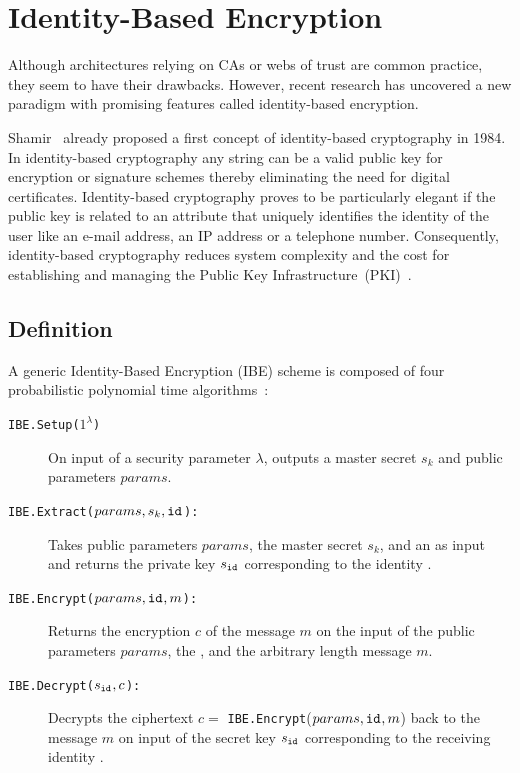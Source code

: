 \section{Identity-Based Encryption}
Although architectures relying on CAs or webs of trust are common practice, they seem to have their drawbacks. However, recent research has uncovered a new paradigm with promising features called identity-based encryption.

Shamir~\cite{art:Shamir84} already proposed a first concept of identity-based cryptography in 1984. In identity-based cryptography any string can be a valid public key for encryption or signature schemes thereby eliminating the need for digital certificates. Identity-based cryptography proves to be particularly elegant if the public key is related to an attribute that uniquely identifies the identity of the user like an e-mail address, an IP address or a telephone number. Consequently, identity-based cryptography reduces system complexity and the cost for establishing and managing the Public Key Infrastructure~(PKI)~\cite{art:BaekNSS04}. 


\subsection{Definition}
A generic Identity-Based Encryption (IBE) scheme is composed of four probabilistic polynomial time algorithms~\cite{art:BonehF01}:
\begin{description}
    \item[\texttt{IBE.Setup($1^{\lambda}$)}] On input of a security parameter $\lambda$, outputs a master secret $s_k$ and public parameters $params$.
    \item[\texttt{IBE.Extract($params, s_k, \mathtt{id}_{}$):}] Takes public parameters $params$, the master secret $s_k$, and an \id{} as input and returns the private key $s_{\mathtt{id}_{}}$ corresponding to the identity \id{}.
    \item[\texttt{IBE.Encrypt($params, \mathtt{id}_{}, m$):}] Returns the encryption $c$ of the message $m$ on the input of the public parameters $params$, the \id{}, and the arbitrary length message $m$.
    \item[\texttt{IBE.Decrypt($s_{\mathtt{id}_{}}, c$):}] Decrypts the ciphertext $c =$ \texttt{IBE.Encrypt}($params, \mathtt{id}_{}, m$) back to the message $m$ on input of the secret key $s_{\mathtt{id}_{}}$ corresponding to the receiving identity \id{}.
\end{description}

